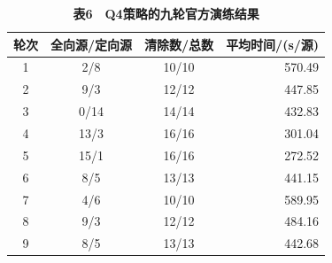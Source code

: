 \begin{table}[H]
\centering
\caption{\textbf{表6　Q4策略的九轮官方演练结果}}
\small
\begin{tabular}{@{}cccr@{}}

\toprule\noalign{}
轮次 & 全向源/定向源 & 清除数/总数 & 平均时间/(s/源) \\
\midrule\noalign{}

1 & 2/8 & 10/10 & 570.49 \\
2 & 9/3 & 12/12 & 447.85 \\
3 & 0/14 & 14/14 & 432.83 \\
4 & 13/3 & 16/16 & 301.04 \\
5 & 15/1 & 16/16 & 272.52 \\
6 & 8/5 & 13/13 & 441.15 \\
7 & 4/6 & 10/10 & 589.95 \\
8 & 9/3 & 12/12 & 484.16 \\
9 & 8/5 & 13/13 & 442.68 \\
\bottomrule
\end{tabular}
\end{table}
